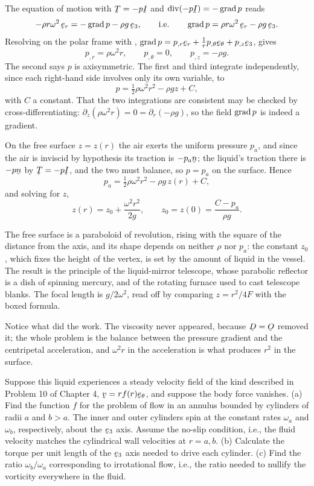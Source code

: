 \begin{solution}
The equation of motion  with $\bT=-p\I$ and
$\dvg(-p\I)=-\grad p$ reads
\[
   -\rho r\omega^{2}\,\ber=-\grad p-\rho g\,\be_{3},
   \qquad\text{i.e.}\qquad
   \grad p=\rho r\omega^{2}\,\ber-\rho g\,\be_{3}.
\]
Resolving on the polar frame with ,
$\grad p=p_{,r}\ber+\tfrac1r p_{,\theta}\bet+p_{,z}\be_{3}$, gives
\[
   p_{,r}=\rho\omega^{2}r,\qquad p_{,\theta}=0,\qquad p_{,z}=-\rho g .
\]
The second says $p$ is axisymmetric. The first and third integrate
independently, since each right-hand side involves only its own
variable, to
\[
   p=\tfrac12\rho\omega^{2}r^{2}-\rho g z+C ,
\]
with $C$ a constant. That the two integrations are consistent may be
checked by cross-differentiating: $\partial_{z}(\rho\omega^{2}r)=0
=\partial_{r}(-\rho g)$, so the field $\operatorname{grad} p$ is indeed a gradient.

On the free surface $z=z(r)$ the air exerts the uniform pressure
$p_{a}$, and since the air is inviscid by hypothesis its traction is
$-p_{a}\bn$; the liquid's traction there is $-p\bn$ by $\bT=-p\I$, and
the two must balance, so $p=p_{a}$ on the surface. Hence
\[
   p_{a}=\tfrac12\rho\omega^{2}r^{2}-\rho g\,z(r)+C ,
\]
and solving for $z$,
\[
   \boxed{\ z(r)=z_{0}+\frac{\omega^{2}r^{2}}{2g},
   \qquad z_{0}=z(0)=\frac{C-p_{a}}{\rho g}. \ }
\]

The free surface is a paraboloid of revolution, rising with the square
of the distance from the axis, and its shape depends on neither $\rho$
nor $p_{a}$: the constant $z_{0}$, which fixes the height of the vertex,
is set by the amount of liquid in the vessel. The result is the
principle of the liquid-mirror telescope, whose parabolic reflector is a
dish of spinning mercury, and of the rotating furnace used to cast
telescope blanks. The focal length is $g/2\omega^{2}$, read off by
comparing $z=r^{2}/4F$ with the boxed formula.

Notice what did the work. The viscosity never appeared, because
$\bD=\Ob$ removed it; the whole problem is the balance between the
pressure gradient and the centripetal acceleration, and $\omega^{2}r$ in
the acceleration is what produces $r^{2}$ in the surface.
\end{solution}

\begin{problem}
Suppose this liquid experiences a steady velocity field of the kind
described in Problem 10 of Chapter 4, $\bv=rf(r)\bet$, and suppose the
body force vanishes.
(a) Find the function $f$ for the problem of flow in an annulus bounded
by cylinders of radii $a$ and $b>a$. The inner and outer cylinders spin
at the constant rates $\omega_{a}$ and $\omega_{b}$, respectively, about
the $\be_{3}$ axis. Assume the no-slip condition, i.e., the fluid
velocity matches the cylindrical wall velocities at $r=a,b$.
(b) Calculate the torque per unit length of the $\be_{3}$ axis needed to
drive each cylinder.
(c) Find the ratio $\omega_{b}/\omega_{a}$ corresponding to irrotational
flow, i.e., the ratio needed to nullify the vorticity everywhere in the
fluid.
\end{problem}

